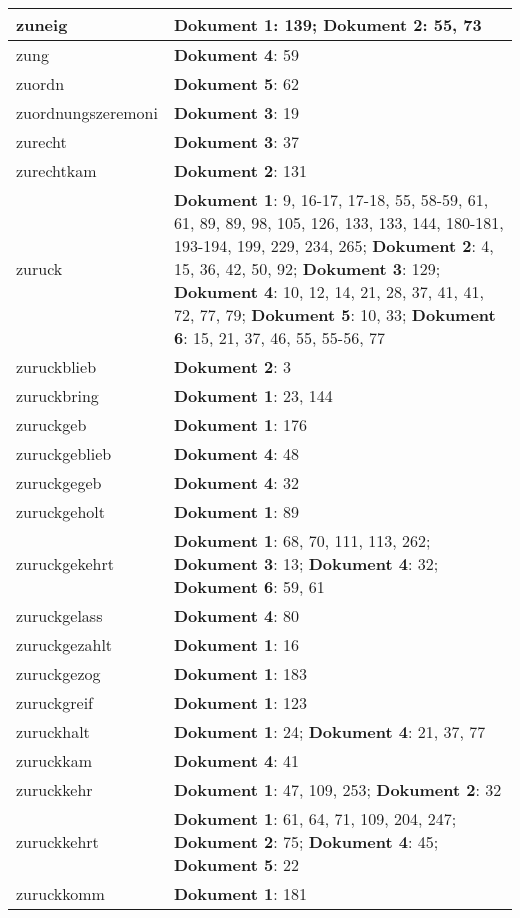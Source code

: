 \documentclass[a5paper]{article}
\begin{document}
\begin{longtable}[l]{|l|p{3in}|}
\hline
zuneig & \textbf{Dokument 1}: 139; \textbf{Dokument 2}: 55, 73 \\
\hline
zung & \textbf{Dokument 4}: 59 \\
\hline
zuordn & \textbf{Dokument 5}: 62 \\
\hline
zuordnungszeremoni & \textbf{Dokument 3}: 19 \\
\hline
zurecht & \textbf{Dokument 3}: 37 \\
\hline
zurechtkam & \textbf{Dokument 2}: 131 \\
\hline
zuruck & \textbf{Dokument 1}: 9, 16-17, 17-18, 55, 58-59, 61, 61, 89, 89, 98, 105, 126, 133, 133, 144, 180-181, 193-194, 199, 229, 234, 265; \textbf{Dokument 2}: 4, 15, 36, 42, 50, 92; \textbf{Dokument 3}: 129; \textbf{Dokument 4}: 10, 12, 14, 21, 28, 37, 41, 41, 72, 77, 79; \textbf{Dokument 5}: 10, 33; \textbf{Dokument 6}: 15, 21, 37, 46, 55, 55-56, 77 \\
\hline
zuruckblieb & \textbf{Dokument 2}: 3 \\
\hline
zuruckbring & \textbf{Dokument 1}: 23, 144 \\
\hline
zuruckgeb & \textbf{Dokument 1}: 176 \\
\hline
zuruckgeblieb & \textbf{Dokument 4}: 48 \\
\hline
zuruckgegeb & \textbf{Dokument 4}: 32 \\
\hline
zuruckgeholt & \textbf{Dokument 1}: 89 \\
\hline
zuruckgekehrt & \textbf{Dokument 1}: 68, 70, 111, 113, 262; \textbf{Dokument 3}: 13; \textbf{Dokument 4}: 32; \textbf{Dokument 6}: 59, 61 \\
\hline
zuruckgelass & \textbf{Dokument 4}: 80 \\
\hline
zuruckgezahlt & \textbf{Dokument 1}: 16 \\
\hline
zuruckgezog & \textbf{Dokument 1}: 183 \\
\hline
zuruckgreif & \textbf{Dokument 1}: 123 \\
\hline
zuruckhalt & \textbf{Dokument 1}: 24; \textbf{Dokument 4}: 21, 37, 77 \\
\hline
zuruckkam & \textbf{Dokument 4}: 41 \\
\hline
zuruckkehr & \textbf{Dokument 1}: 47, 109, 253; \textbf{Dokument 2}: 32 \\
\hline
zuruckkehrt & \textbf{Dokument 1}: 61, 64, 71, 109, 204, 247; \textbf{Dokument 2}: 75; \textbf{Dokument 4}: 45; \textbf{Dokument 5}: 22 \\
\hline
zuruckkomm & \textbf{Dokument 1}: 181 \\

\end{longtable}
\end{document}
